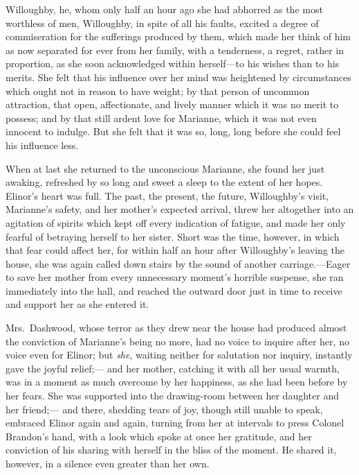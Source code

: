\documentclass{article}
\begin{document}
Willoughby, he, whom only half an hour ago she had
abhorred as the most worthless of men, Willoughby, in spite
of all his faults, excited a degree of commiseration
for the sufferings produced by them, which made her
think of him as now separated for ever from her family,
with a tenderness, a regret, rather in proportion, as she
soon acknowledged within herself---to his wishes than to
his merits.  She felt that his influence over her mind
was heightened by circumstances which ought not in reason
to have weight; by that person of uncommon attraction,
that open, affectionate, and lively manner which it
was no merit to possess; and by that still ardent love
for Marianne, which it was not even innocent to indulge.
But she felt that it was so, long, long before she could
feel his influence less.

When at last she returned to the unconscious Marianne,
she found her just awaking, refreshed by so long and sweet
a sleep to the extent of her hopes.  Elinor's heart was full.
The past, the present, the future, Willoughby's visit,
Marianne's safety, and her mother's expected arrival,
threw her altogether into an agitation of spirits
which kept off every indication of fatigue, and made
her only fearful of betraying herself to her sister.
Short was the time, however, in which that fear could
affect her, for within half an hour after Willoughby's
leaving the house, she was again called down stairs
by the sound of another carriage.---Eager to save her
mother from every unnecessary moment's horrible suspense,
she ran immediately into the hall, and reached the outward
door just in time to receive and support her as she entered it.

Mrs.\ Dashwood, whose terror as they drew near the
house had produced almost the conviction of Marianne's
being no more, had no voice to inquire after her,
no voice even for Elinor; but \emph{she}, waiting neither for
salutation nor inquiry, instantly gave the joyful relief;---%
and her mother, catching it with all her usual warmth,
was in a moment as much overcome by her happiness, as she
had been before by her fears.  She was supported into
the drawing-room between her daughter and her friend;---%
and there, shedding tears of joy, though still unable
to speak, embraced Elinor again and again, turning from her
at intervals to press Colonel Brandon's hand, with a look
which spoke at once her gratitude, and her conviction
of his sharing with herself in the bliss of the moment.
He shared it, however, in a silence even greater than her own.
\end{document}
